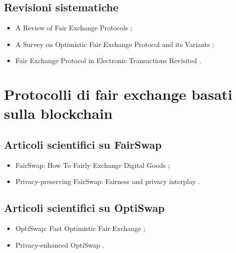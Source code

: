 \subsection*{Revisioni sistematiche}
\begin{itemize}

\item A Review of Fair Exchange Protocols \cite{alotaibi2012fairreview};

\item A Survey on Optimistic Fair Exchange Protocol and its Variants \cite{loh2017fairreview};

\item Fair Exchange Protocol in Electronic Transactions Revisited \cite{duangphasuk2020fairreview}.

\end{itemize}

\section*{Protocolli di fair exchange basati sulla blockchain}

\subsection*{Articoli scientifici su FairSwap}
\begin{itemize}

\item FairSwap: How To Fairly Exchange Digital Goods \cite{dziembowski2018fairswap};

\item Privacy-preserving FairSwap: Fairness and privacy interplay \cite{avizheh2022fairswap}.

\end{itemize}

\subsection*{Articoli scientifici su OptiSwap}
\begin{itemize}

\item OptiSwap: Fast Optimistic Fair Exchange \cite{eckey2020optiswap};

\item Privacy-enhanced OptiSwap \cite{avizheh2021optiswap}.

\end{itemize}

